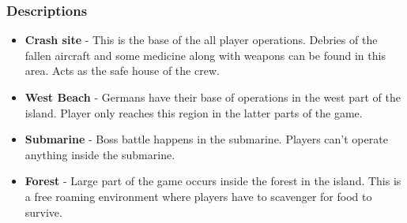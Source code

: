         \subsubsection{Descriptions}
            \begin{itemize}
                \item \textbf{Crash site} - This is the base of the all player operations.
                Debries of the fallen aircraft and some medicine along with weapons can be found
                in this area. Acts as the safe house of the crew.
                \item \textbf{West Beach} - Germans have their base of operations in the west part
                of the island. Player only reaches this region in the latter parts of the game.
                \item \textbf{Submarine} - Boss battle happens in the submarine. Players can't operate
                anything inside the submarine.
                \item \textbf{Forest} - Large part of the game occurs inside the forest in the 
                island. This is a free roaming environment where players have to scavenger for 
                food to survive. 
            \end{itemize}
